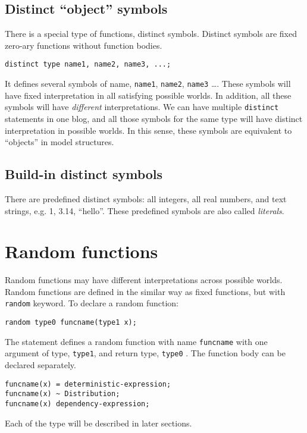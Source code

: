\documentclass[12pt]{article}
\begin{document}
\subsection{Distinct ``object'' symbols}
There is a special type of functions, distinct symbols. 
Distinct symbols are fixed zero-ary functions without function bodies.
\begin{verbatim}
distinct type name1, name2, name3, ...;
\end{verbatim}
It defines several symbols of name, \texttt{name1}, \texttt{name2}, \texttt{name3} \dots.
These symbols will have fixed interpretation in all satisfying possible worlds. In addition, all these symbols will have \emph{different} interpretations. 
We can have multiple \texttt{distinct} statements in one blog, and all those symbols for the same type will have 
distinct interpretation in possible worlds. In this sense, these symbols are equivalent to ``objects'' in model structures. 

\subsection{Build-in distinct symbols}
There are predefined distinct symbols: all integers, all real numbers, and text strings, e.g. 1, 3.14, ``hello''. These predefined symbols are also called {\em literals}.


\section{Random functions}
Random functions may have different interpretations across possible worlds. Random functions are defined in the similar way as fixed functions, but with \texttt{random} keyword.
To declare a random function:
\begin{verbatim}
random type0 funcname(type1 x);
\end{verbatim}
The statement defines a random function with name \texttt{funcname} with one argument of type, \texttt{type1}, and return type, \texttt{type0} . The function body can be declared separately. 
\begin{verbatim}
funcname(x) = deterministic-expression;
funcname(x) ~ Distribution;
funcname(x) dependency-expression;
\end{verbatim}
 Each of the type will be described in later sections.
\end{document}
